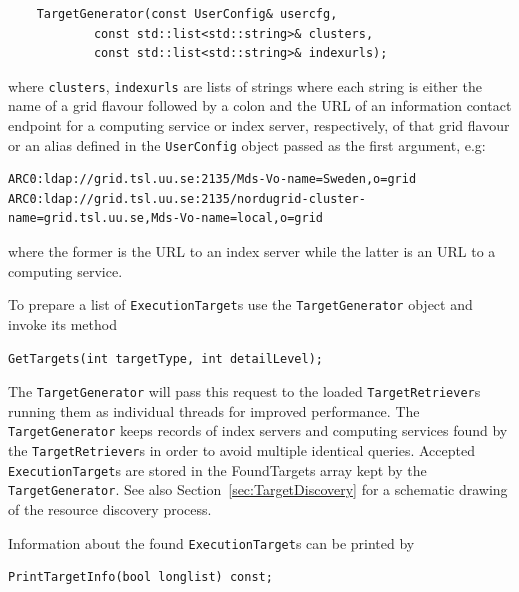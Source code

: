 \documentclass{book}
\newcommand{\ExecutionTarget}{\texttt{ExecutionTarget}}
\newcommand{\TargetGenerator}{\texttt{TargetGenerator}}
\newcommand{\TargetRetriever}{\texttt{TargetRetriever}}
\newcommand{\UserConfig}{\texttt{UserConfig}}
\begin{document}
\begin{shaded}
\begin{verbatim}
    TargetGenerator(const UserConfig& usercfg,
		    const std::list<std::string>& clusters,
		    const std::list<std::string>& indexurls);
\end{verbatim}
\end{shaded}

where \texttt{clusters}, \texttt{indexurls} are lists of strings where
each string is either the name of a grid flavour followed by a colon
and the URL of an information contact endpoint for a computing service
or index server, respectively, of that grid flavour or an alias
defined in the {\UserConfig} object passed as the first
argument, e.g:

\begin{shaded}
\begin{small}
\begin{verbatim}
ARC0:ldap://grid.tsl.uu.se:2135/Mds-Vo-name=Sweden,o=grid
ARC0:ldap://grid.tsl.uu.se:2135/nordugrid-cluster-name=grid.tsl.uu.se,Mds-Vo-name=local,o=grid
\end{verbatim}
\end{small}
\end{shaded}

where the former is the URL to an index server while the latter is an
URL to a computing service.

To prepare a list of {\ExecutionTarget}s use the {\TargetGenerator}
object and invoke its method

\begin{shaded}
\begin{verbatim}
GetTargets(int targetType, int detailLevel);
\end{verbatim}
\end{shaded}

The {\TargetGenerator} will pass this request to the loaded
{\TargetRetriever}s running them as individual threads for improved
performance. The {\TargetGenerator} keeps records of index servers and
computing services found by the {\TargetRetriever}s in order to avoid
multiple identical queries. Accepted {\ExecutionTarget}s are stored in
the FoundTargets array kept by the {\TargetGenerator}. See also
Section~\ref{sec:TargetDiscovery} for a schematic drawing of the
resource discovery process.

Information about the found {\ExecutionTarget}s can be printed by 

\begin{shaded}
\begin{verbatim}
PrintTargetInfo(bool longlist) const;
\end{verbatim}
\end{shaded}
\end{document}
